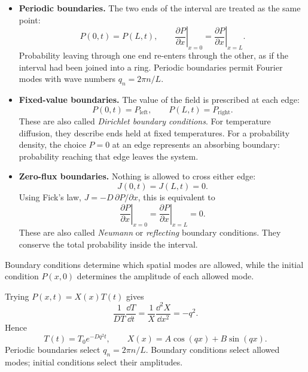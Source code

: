 \begin{itemize}
    \item \textbf{Periodic boundaries.}
    The two ends of the interval are treated as the same point:
    \[
        P(0,t)=P(L,t), \qquad \left.\frac{\partial P}{\partial x}\right|_{x=0}=\left.\frac{\partial P}{\partial x}\right|_{x=L}.
    \]
    Probability leaving through one end re-enters through the other, as if the interval had been joined into a ring.
    Periodic boundaries permit Fourier modes with wave numbers $q_n=2\pi n/L$.

    \item \textbf{Fixed-value boundaries.}
    The value of the field is prescribed at each edge:
    \[
        P(0,t)=P_{\mathrm{left}}, \qquad P(L,t)=P_{\mathrm{right}}.
    \]
    These are also called \emph{Dirichlet boundary conditions}.
    For temperature diffusion, they describe ends held at fixed temperatures.
    For a probability density, the choice $P=0$ at an edge represents an absorbing boundary: probability reaching that edge leaves the system.

    \item \textbf{Zero-flux boundaries.}
    Nothing is allowed to cross either edge:
    \[
        J(0,t)=J(L,t)=0.
    \]
    Using Fick's law, $J=-D\,\partial P/\partial x$, this is equivalent to
    \[
        \left.\frac{\partial P}{\partial x}\right|_{x=0}=\left.\frac{\partial P}{\partial x}\right|_{x=L}=0.
    \]
    These are also called \emph{Neumann} or \emph{reflecting} boundary conditions.
    They conserve the total probability inside the interval.
\end{itemize}

Boundary conditions determine which spatial modes are allowed, while the initial condition $P(x,0)$ determines the amplitude of each allowed mode.

Trying $P(x,t)=X(x)T(t)$ gives
\[
    \frac{1}{DT}\frac{\dd T}{\dd t}=\frac{1}{X}\frac{\dd^2X}{\dd x^2}=-q^2.
\]
Hence
\[
    T(t)=T_0e^{-Dq^2t}, \qquad X(x)=A\cos(qx)+B\sin(qx).
\]
Periodic boundaries select $q_n=2\pi n/L$.
Boundary conditions select allowed modes; initial conditions select their amplitudes.

